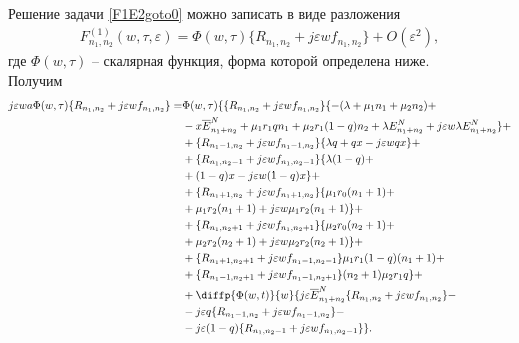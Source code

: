 Решение задачи \eqref{F1E2goto0} можно записать в виде разложения
\begin{align}\label{expansionF}
F_{n_{1}, n_{2}}^{(1)}(w,\tau,\varepsilon)=\Phi (w,\tau)\{R_{n_{1}, n_{2}}+j\varepsilon w f_{n_{1}, n_{2}}\}+O(\varepsilon^2),
\end{align}
где $\Phi (w,\tau)$ -- скалярная функция, форма которой определена ниже. \\
\hspace*{\parindent}%
Получим \\
 \begin{equation}
	\begin{split}
		j\varepsilon wa \Phi (w,\tau)\{R_{n_{1}, n_{2}}+j\varepsilon w f_{n_{1}, n_{2}}\}=
		&\Phi (w,\tau)\{\{R_{n_{1}, n_{2}}+j\varepsilon w f_{n_{1}, n_{2}}\}\{-(\lambda+\mu_{1}n_{1}+\mu_{2}n_{2}) +\\
		&-x\overline{E}_{n_{1}+n_{2}}^N+\mu_{1}r_{1}q n_{1}+ \mu_{2}r_{1}(1-q)n_{2}+ \lambda E_{n_{1}+n_{2}}^N +j\varepsilon w \lambda E_{n_{1}+n_{2}}^N \}+\\
		&+\{R_{n_{1}-1, n_{2}}+j\varepsilon w f_{n_{1}-1, n_{2}}\}\{\lambda q+ q  x-j\varepsilon wq x\}+\\
		&+\{R_{n_{1}, n_{2}-1}+j\varepsilon w f_{n_{1}, n_{2}-1}\}\{\lambda (1-q)+\\
		&+ (1-q) x -j\varepsilon w(1-q) x \}+\\
		&+ \{R_{n_{1}+1, n_{2}}+j\varepsilon w f_{n_{1}+1, n_{2}}\}\{\mu_{1} r_{0}(n_{1}+1)+\\
		& + \mu_{1} r_{2}(n_{1}+1)+j\varepsilon w\mu_{1} r_{2}(n_{1}+1)\}+\\
		&+ \{R_{n_{1}, n_{2}+1}+j\varepsilon w f_{n_{1}, n_{2}+1}\}\{\mu_{2} r_{0}(n_{2}+1)+\\
		& + \mu_{2} r_{2} (n_{2}+1) +j\varepsilon w\mu_{2} r_{2} (n_{2}+1)\}+\\
		&+\{R_{n_{1}+1, n_{2}+1}+j\varepsilon w f_{n_{1}-1, n_{2}-1}\}\mu_{1} r_{1}(1-q)(n_{1}+1) +\\
		&+\{R_{n_{1}-1, n_{2}+1}+j\varepsilon w f_{n_{1}-1, n_{2}+1}\}(n_{2}+1)\mu_{2} r_{1}q\}  +\\
		&+ \diffp{\Phi(w,t)}{w}\{j\varepsilon \overline{E}_{n_{1}+n_{2}}^N\{R_{n_{1}, n_{2}}+j\varepsilon w f_{n_{1}, n_{2}}\}-\\
		&-  j\varepsilon q  \{R_{n_{1}-1, n_{2}}+j\varepsilon w f_{n_{1}-1, n_{2}}\}-\\
		&- j \varepsilon (1-q) \{R_{n_{1}, n_{2}-1}+j\varepsilon w f_{n_{1}, n_{2}-1}\}\}.
	\end{split}
\end{equation}
